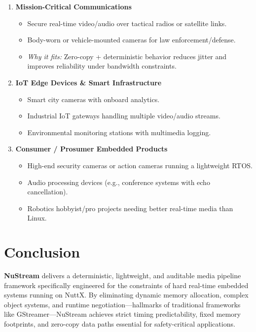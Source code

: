 \documentclass{article}
\begin{document}
\begin{enumerate}
\item \textbf{Mission-Critical Communications}
    \begin{itemize}
        \item Secure real-time video/audio over tactical radios or satellite links.
        \item Body-worn or vehicle-mounted cameras for law enforcement/defense.
        \item \textit{Why it fits:} Zero-copy + deterministic behavior reduces jitter and improves reliability under bandwidth constraints.
    \end{itemize}

\item \textbf{IoT Edge Devices \& Smart Infrastructure}
    \begin{itemize}
        \item Smart city cameras with onboard analytics.
        \item Industrial IoT gateways handling multiple video/audio streams.
        \item Environmental monitoring stations with multimedia logging.
    \end{itemize}

\item \textbf{Consumer / Prosumer Embedded Products}
    \begin{itemize}
        \item High-end security cameras or action cameras running a lightweight RTOS.
        \item Audio processing devices (e.g., conference systems with echo cancellation).
        \item Robotics hobbyist/pro projects needing better real-time media than Linux.
    \end{itemize}
\end{enumerate}

\section{Conclusion}

\textbf{NuStream} delivers a deterministic, lightweight, and auditable media pipeline framework specifically engineered
for the constraints of hard real-time embedded systems running on NuttX. By eliminating dynamic memory allocation,
complex object systems, and runtime negotiation—hallmarks of traditional frameworks like GStreamer—NuStream
achieves strict timing predictability, fixed memory footprints, and zero-copy data paths essential for safety-critical applications.
\end{document}
